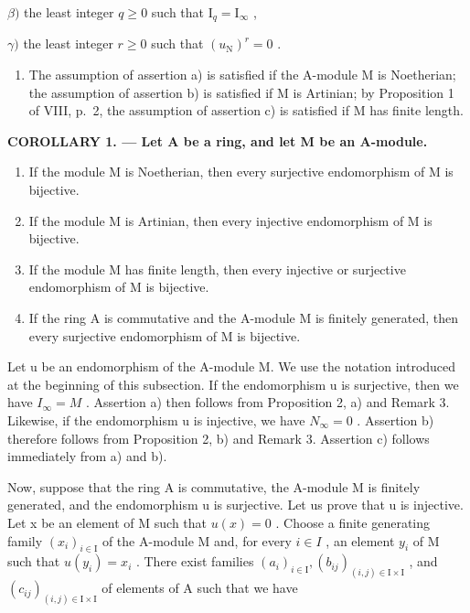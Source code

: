 \(\beta)\) the least integer \(q \geqslant 0\) such that \(\mathrm{I}_q = \mathrm{I}_{\infty}\) ,

\(\gamma)\) the least integer \(r \geqslant 0\) such that \((u_{\mathrm{N}})^{r} = 0\) .

\begin{enumerate}
\def\labelenumi{\arabic{enumi})}
\setcounter{enumi}{2}
\tightlist
\item
  The assumption of assertion a) is satisfied if the A-module M is Noetherian; the assumption of assertion b) is satisfied if M is Artinian; by Proposition 1 of VIII, p.~2, the assumption of assertion c) is satisfied if M has finite length.
\end{enumerate}

\textbf{COROLLARY 1. --- Let A be a ring, and let M be an A-module.}

\begin{enumerate}
\def\labelenumi{\alph{enumi})}
\item
  If the module M is Noetherian, then every surjective endomorphism of M is bijective.
\item
  If the module M is Artinian, then every injective endomorphism of M is bijective.
\item
  If the module M has finite length, then every injective or surjective endomorphism of M is bijective.
\item
  If the ring A is commutative and the A-module M is finitely generated, then every surjective endomorphism of M is bijective.
\end{enumerate}

Let u be an endomorphism of the A-module M. We use the notation introduced at the beginning of this subsection. If the endomorphism u is surjective, then we have \(I_{\infty} = M\) . Assertion a) then follows from Proposition 2, a) and Remark 3. Likewise, if the endomorphism u is injective, we have \(N_{\infty} = 0\) . Assertion b) therefore follows from Proposition 2, b) and Remark 3. Assertion c) follows immediately from a) and b).

Now, suppose that the ring A is commutative, the A-module M is finitely generated, and the endomorphism u is surjective. Let us prove that u is injective. Let x be an element of M such that \(u(x) = 0\) . Choose a finite generating family \((x_{i})_{i \in \mathrm{I}}\) of the A-module M and, for every \(i \in I\) , an element \(y_{i}\) of M such that \(u(y_{i}) = x_{i}\) . There exist families \((a_{i})_{i \in \mathrm{I}}, (b_{ij})_{(i,j) \in \mathrm{I} \times \mathrm{I}}\) , and \((c_{ij})_{(i,j) \in \mathrm{I} \times \mathrm{I}}\) of elements of A such that we have

